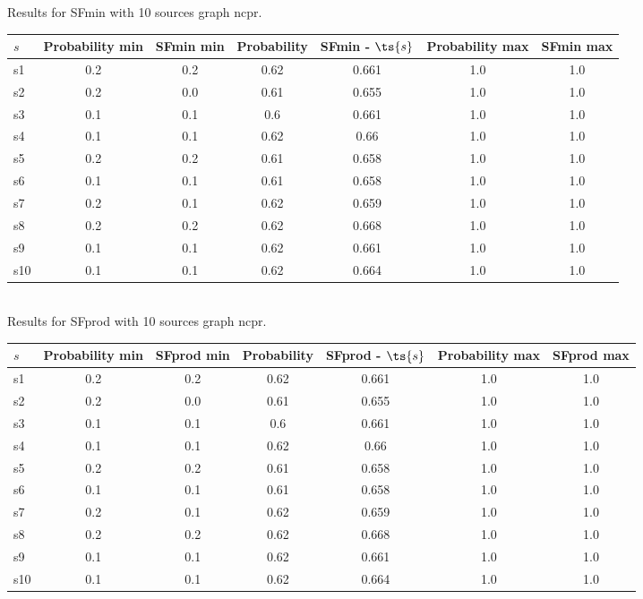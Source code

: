 \documentclass{article}
\begin{document}
\noindent Results for SFmin with 10 sources graph ncpr.

\noindent\begin{tabular}{|l|c|c|c|c|c|c|}
\hline
$s$& Probability min & SFmin min & Probability & SFmin - $\ts{s}$ & Probability max & SFmin max\\
\hline
s1 &0.2 & 0.2 & 0.62 & 0.661 & 1.0 & 1.0\\
\hline
s2 &0.2 & 0.0 & 0.61 & 0.655 & 1.0 & 1.0\\
\hline
s3 &0.1 & 0.1 & 0.6 & 0.661 & 1.0 & 1.0\\
\hline
s4 &0.1 & 0.1 & 0.62 & 0.66 & 1.0 & 1.0\\
\hline
s5 &0.2 & 0.2 & 0.61 & 0.658 & 1.0 & 1.0\\
\hline
s6 &0.1 & 0.1 & 0.61 & 0.658 & 1.0 & 1.0\\
\hline
s7 &0.2 & 0.1 & 0.62 & 0.659 & 1.0 & 1.0\\
\hline
s8 &0.2 & 0.2 & 0.62 & 0.668 & 1.0 & 1.0\\
\hline
s9 &0.1 & 0.1 & 0.62 & 0.661 & 1.0 & 1.0\\
\hline
s10 &0.1 & 0.1 & 0.62 & 0.664 & 1.0 & 1.0\\
\hline
\end{tabular}\\

\noindent Results for SFprod with 10 sources graph ncpr.

\noindent\begin{tabular}{|l|c|c|c|c|c|c|}
\hline
$s$& Probability min & SFprod min & Probability & SFprod - $\ts{s}$ & Probability max & SFprod max\\
\hline
s1 &0.2 & 0.2 & 0.62 & 0.661 & 1.0 & 1.0\\
\hline
s2 &0.2 & 0.0 & 0.61 & 0.655 & 1.0 & 1.0\\
\hline
s3 &0.1 & 0.1 & 0.6 & 0.661 & 1.0 & 1.0\\
\hline
s4 &0.1 & 0.1 & 0.62 & 0.66 & 1.0 & 1.0\\
\hline
s5 &0.2 & 0.2 & 0.61 & 0.658 & 1.0 & 1.0\\
\hline
s6 &0.1 & 0.1 & 0.61 & 0.658 & 1.0 & 1.0\\
\hline
s7 &0.2 & 0.1 & 0.62 & 0.659 & 1.0 & 1.0\\
\hline
s8 &0.2 & 0.2 & 0.62 & 0.668 & 1.0 & 1.0\\
\hline
s9 &0.1 & 0.1 & 0.62 & 0.661 & 1.0 & 1.0\\
\hline
s10 &0.1 & 0.1 & 0.62 & 0.664 & 1.0 & 1.0\\
\hline
\end{tabular}\\
\end{document}
